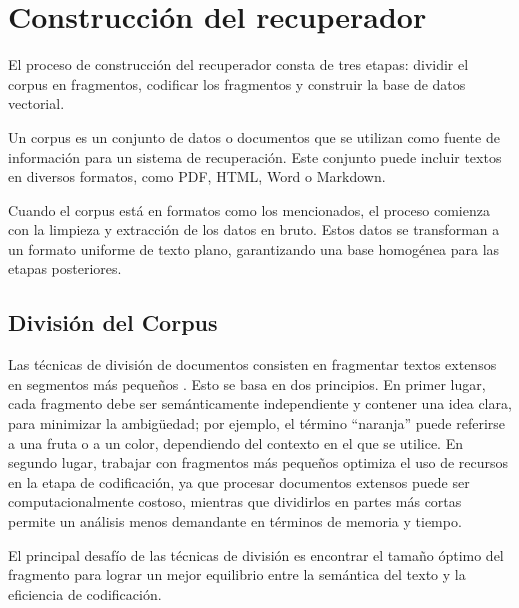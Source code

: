 \section{Construcción del recuperador}

El proceso de construcción del recuperador consta de tres etapas: dividir el corpus en fragmentos, codificar los fragmentos y construir la base de datos vectorial.

Un corpus es un conjunto de datos o documentos que se utilizan como fuente de información para un sistema de recuperación. Este conjunto puede incluir textos en diversos formatos, como PDF, HTML, Word o Markdown.

Cuando el corpus está en formatos como los mencionados, el proceso comienza con la limpieza y extracción de los datos en bruto. Estos datos se transforman a un formato uniforme de texto plano, garantizando una base homogénea para las etapas posteriores.

\subsection{División del Corpus}

Las técnicas de división de documentos consisten en fragmentar textos extensos en segmentos más pequeños \cite{gong2020recurrentchunkingmechanismslongtext}. Esto se basa en dos principios. En primer lugar, cada fragmento debe ser semánticamente independiente y contener una idea clara, para minimizar la ambigüedad; por ejemplo, el término ``naranja'' puede referirse a una fruta o a un color, dependiendo del contexto en el que se utilice. En segundo lugar, trabajar con fragmentos más pequeños optimiza el uso de recursos en la etapa de codificación, ya que procesar documentos extensos puede ser computacionalmente costoso, mientras que dividirlos en partes más cortas permite un análisis menos demandante en términos de memoria y tiempo.

El principal desafío de las técnicas de división es encontrar el tamaño óptimo del fragmento para lograr un mejor equilibrio entre la semántica del texto y la eficiencia de codificación.

